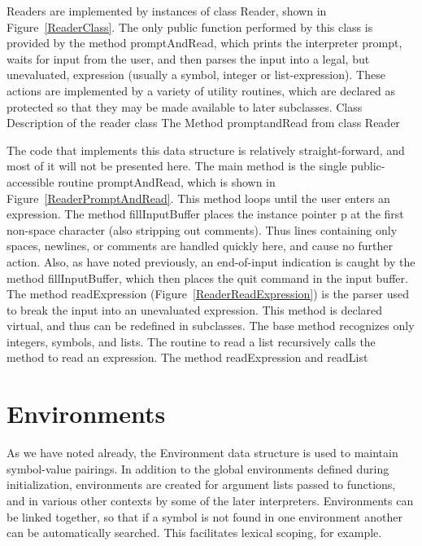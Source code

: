Readers are implemented by instances of class {\sf Reader}, shown in
Figure~\ref{ReaderClass}.  The only public function performed by this class is
provided by the method {\sf promptAndRead}, which prints the interpreter prompt,
waits for input from the user, and then parses the input into a legal, but
unevaluated, expression (usually a symbol, integer or list-expression).  These
actions are implemented by a variety of utility routines, which are declared as
{\sf protected} so that they may be made available to later subclasses.
%
{Class Description of the reader class}
{The Method {\sf promptandRead} from class {\sf Reader}}

The code that implements this data structure is relatively straight-forward, and
most of it will not be presented here.  The main method is the single
public-accessible routine {\sf promptAndRead}, which is shown in
Figure~\ref{ReaderPromptAndRead}.  This method loops until the user enters an
expression.  The method {\sf fillInputBuffer} places the instance pointer {\sf
    p} at the first non-space character (also stripping out comments).  Thus
lines containing only spaces, newlines, or comments are handled quickly here,
and cause no further action.  Also, as have noted previously, an end-of-input
indication is caught by the method {\sf fillInputBuffer}, which then places the
{\sf quit} command in the input buffer.  The method {\sf readExpression}
(Figure~\ref{ReaderReadExpression}) is the parser used to break the input into
an unevaluated expression.  This method is declared {\sf virtual}, and thus can
be redefined in subclasses.  The base method recognizes only integers, symbols,
and lists.  The routine to read a list recursively calls the method to read an
expression.
%
{The method {\sf readExpression} and {\sf readList}}

\section{Environments}

As we have noted already, the {\sf Environment} data structure is used to
maintain symbol-value pairings.  In addition to the global environments defined
during initialization, environments are created for argument lists passed to
functions, and in various other contexts by some of the later interpreters.
Environments can be linked together, so that if a symbol is not found in one
environment another can be automatically searched.  This facilitates lexical
scoping, for example.

